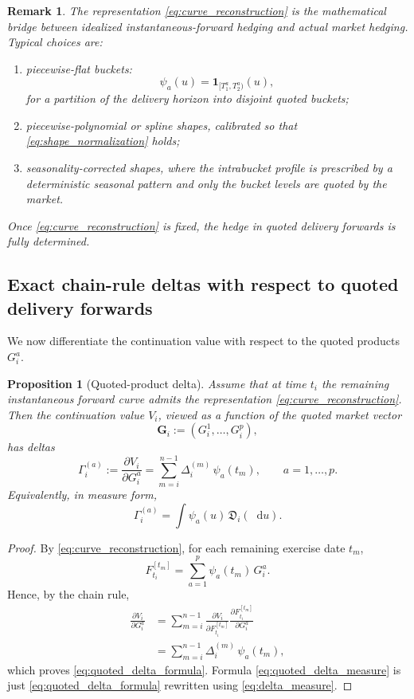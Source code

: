 \documentclass[10pt,a4paper,reqno]{amsart}
\newcommand{\<}{\langle}
\renewcommand{\>}{\rangle}
\newtheorem{remark}[theorem]{Remark}
\newtheorem{proposition}[theorem]{Proposition}
\theoremstyle{example}
\newcommand*\D{\mathop{}\!\mathrm{d}}
\begin{document}
\begin{remark}
\label{rem:shape_choice}
The representation \eqref{eq:curve_reconstruction} is the mathematical bridge between idealized
instantaneous-forward hedging and actual market hedging. Typical choices are:
\begin{enumerate}
    \item \emph{piecewise-flat buckets:}
    \[
    \psi_a(u)=\mathbf{1}_{[T_1^a,T_2^a)}(u),
    \]
    for a partition of the delivery horizon into disjoint quoted buckets;
    \item \emph{piecewise-polynomial or spline shapes}, calibrated so that
    \eqref{eq:shape_normalization} holds;
    \item \emph{seasonality-corrected shapes}, where the intrabucket profile is prescribed
    by a deterministic seasonal pattern and only the bucket levels are quoted by the market.
\end{enumerate}
Once \eqref{eq:curve_reconstruction} is fixed, the hedge in quoted delivery forwards is fully determined.
\end{remark}

\subsection{Exact chain-rule deltas with respect to quoted delivery forwards}

We now differentiate the continuation value with respect to the quoted products $G_i^a$.

\begin{proposition}[Quoted-product delta]
\label{prop:quoted_product_delta}
Assume that at time $t_i$ the remaining instantaneous forward curve admits the representation
\eqref{eq:curve_reconstruction}. Then the continuation value $V_i$, viewed as a function of the quoted
market vector
\[
\mathbf{G}_i := (G_i^1,\dots,G_i^p),
\]
has deltas
\begin{equation}
\label{eq:quoted_delta_formula}
\Gamma_i^{(a)}
:=
\frac{\partial V_i}{\partial G_i^a}
=
\sum_{m=i}^{n-1}
\Delta_i^{(m)}\,\psi_a(t_m),
\qquad a=1,\dots,p.
\end{equation}
Equivalently, in measure form,
\begin{equation}
\label{eq:quoted_delta_measure}
\Gamma_i^{(a)}
=
\int \psi_a(u)\,\mathfrak{D}_i(\D u).
\end{equation}
\end{proposition}

\begin{proof}
By \eqref{eq:curve_reconstruction}, for each remaining exercise date $t_m$,
\[
F_{t_i}^{[t_m]}
=
\sum_{a=1}^p \psi_a(t_m)\,G_i^a.
\]
Hence, by the chain rule,
\begin{align*}
\frac{\partial V_i}{\partial G_i^a}
&=
\sum_{m=i}^{n-1}
\frac{\partial V_i}{\partial F_{t_i}^{[t_m]}}
\frac{\partial F_{t_i}^{[t_m]}}{\partial G_i^a} \\
&=
\sum_{m=i}^{n-1}
\Delta_i^{(m)}\,\psi_a(t_m),
\end{align*}
which proves \eqref{eq:quoted_delta_formula}. Formula
\eqref{eq:quoted_delta_measure} is just \eqref{eq:quoted_delta_formula} rewritten using
\eqref{eq:delta_measure}.
\end{proof}
\end{document}
